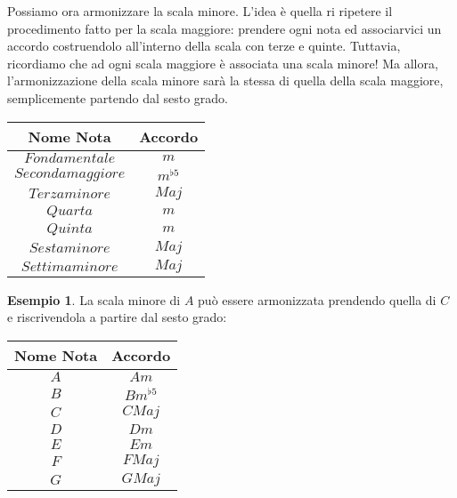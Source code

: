 \documentclass[12pt,a4paper]{book}
\theoremstyle{definition}
\theoremstyle{Theorem}
\theoremstyle{definition}
\newtheorem{Ex}[Def]{Esempio}
\theoremstyle{definition}
\theoremstyle{definition}
\begin{document}
	 		Possiamo ora armonizzare la scala minore. L'idea è quella ri ripetere il procedimento fatto per la scala maggiore: prendere ogni nota ed associarvici un accordo costruendolo all'interno della scala con terze e quinte. Tuttavia, ricordiamo che ad ogni scala maggiore è associata una scala minore! Ma allora, l'armonizzazione della scala minore sarà la stessa di quella della scala maggiore, semplicemente partendo dal sesto grado.
	 		\begin{center}
	 			\begin{tabular}{||c|c||}
	 				\hline
	 				Nome Nota & Accordo\\
	 				\hline
	 				$Fondamentale$ & $m$\\
	 				\hline
	 				$Seconda maggiore$ & $m^{\flat5}$\\
	 				\hline
	 				$Terza minore$ & $Maj$\\
	 				\hline
	 				$Quarta$ & $m$\\
	 				\hline
	 				$Quinta$ & $m$\\
	 				\hline
	 				$Sesta minore$ & $Maj$\\
	 				\hline
	 				$Settima minore$ & $Maj$\\
	 				\hline
	 			\end{tabular}
	 		\end{center}
	 		\begin{Ex}
	 			La scala minore di $A$ può essere armonizzata prendendo quella di $C$ e riscrivendola a partire dal sesto grado:
	 			\begin{center}
	 				\begin{tabular}{||c|c||}
	 					\hline
	 					Nome Nota & Accordo\\
	 					\hline
	 					$A$ & $Am$\\
	 					\hline
	 					$B$ & $Bm^{\flat5}$\\
	 					\hline
	 					$C$ & $CMaj$\\
	 					\hline
	 					$D$ & $Dm$\\
	 					\hline
	 					$E$ & $Em$\\
	 					\hline
	 					$F$ & $FMaj$\\
	 					\hline
	 					$G$ & $GMaj$\\
	 					\hline
	 				\end{tabular}
	 			\end{center}
	 		\end{Ex}
\end{document}
